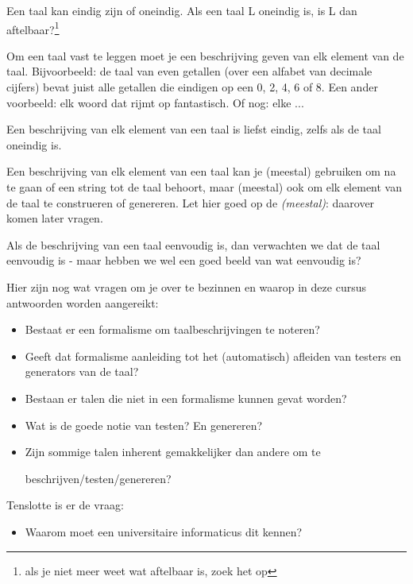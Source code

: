 Een taal kan eindig zijn of oneindig. Als een taal L oneindig is, is L
dan aftelbaar?\footnote{als je niet meer weet wat aftelbaar is, zoek
het op}

Om een taal vast te leggen moet je een beschrijving geven van elk
element van de taal. Bijvoorbeeld: de taal van even getallen (over een
alfabet van decimale cijfers) bevat juist alle getallen die eindigen
op een 0, 2, 4, 6 of 8. Een ander voorbeeld: elk woord dat rijmt op
fantastisch. Of nog: elke ...

Een beschrijving van elk element van een taal is liefst eindig, zelfs
als de taal oneindig is.


Een beschrijving van elk element van een taal kan je (meestal)
gebruiken om na te gaan of een string tot de taal behoort, maar
(meestal) ook om elk element van de taal te construeren of genereren.
Let hier goed op de {\em (meestal)}: daarover komen later vragen.

Als de beschrijving van een taal eenvoudig is, dan verwachten we dat
de taal eenvoudig is - maar hebben we wel een goed beeld van wat
eenvoudig is? 

Hier zijn nog wat vragen om je over te bezinnen en waarop in deze
cursus antwoorden worden aangereikt:

\begin{itemize}
\item 
Bestaat er een formalisme om taalbeschrijvingen te noteren?

\item 
Geeft dat formalisme aanleiding tot het (automatisch) afleiden van
testers en generators van de taal?

\item 
Bestaan er talen die niet in een formalisme kunnen gevat worden?

\item
Wat is de goede notie van testen? En genereren?

\item
Zijn sommige talen inherent gemakkelijker dan andere om te

beschrijven/testen/genereren?

\end{itemize}

Tenslotte is er de vraag:

\begin{itemize}
\item[] Waarom moet een universitaire informaticus dit kennen?
\end{itemize}


